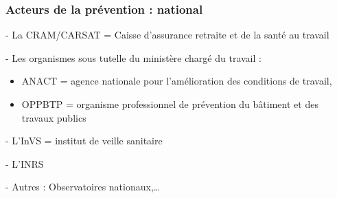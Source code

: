 \documentclass{beamer}
\begin{document}
\begin{frame}
\frametitle{Acteurs de la prévention : national}


- La CRAM/CARSAT = Caisse d'assurance retraite et de la santé au travail 

- Les organismes sous tutelle du ministère chargé du travail : 
\begin{itemize}[label=$\square$]
        \item ANACT = agence nationale pour l’amélioration des conditions de travail,
        \item OPPBTP = organisme professionnel de prévention du bâtiment et des travaux publics
\end{itemize}

- L’InVS = institut de veille sanitaire

- L’INRS 

- Autres : Observatoires nationaux,…

\end{frame} 
\end{document}
